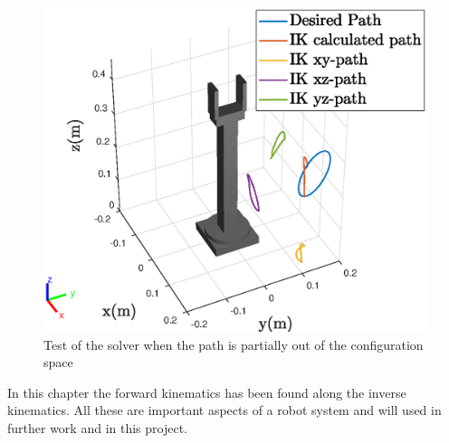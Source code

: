 \begin{figure}[htbp]
  \centering
  \includegraphics[width=.8\textwidth]{img/outOS.eps}
  \caption{Test of the solver when the path is partially out of the configuration space}
  \label{fig:outOC}
\end{figure}

In this chapter the forward kinematics has been found along the inverse kinematics. All these are important aspects of a robot system and will used in further work and in this project. 







































